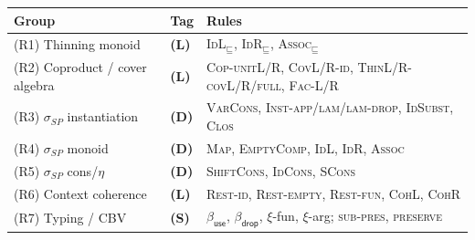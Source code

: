 \documentclass{article}
\newcommand{\thin}{\sqsubseteq}                    %
\newcommand{\catL}{\textbf{(L)}}
\newcommand{\catD}{\textbf{(D)}}
\newcommand{\catS}{\textbf{(S)}}
\theoremstyle{plain}
\begin{document}
\noindent
\begin{tabular}{@{}lll@{}}
\hline
\textbf{Group} & \textbf{Tag} & \textbf{Rules} \\
\hline
(R1) Thinning monoid & \catL & \textsc{IdL}$_\thin$, \textsc{IdR}$_\thin$, \textsc{Assoc}$_\thin$ \\
(R2) Coproduct / cover algebra & \catL & \textsc{Cop-unitL/R}, \textsc{CovL/R-id}, \textsc{ThinL/R-covL/R/full}, \textsc{Fac-L/R} \\
(R3) $\sigma_{SP}$ instantiation & \catD & \textsc{VarCons}, \textsc{Inst-app/lam/lam-drop}, \textsc{IdSubst}, \textsc{Clos} \\
(R4) $\sigma_{SP}$ monoid & \catD & \textsc{Map}, \textsc{EmptyComp}, \textsc{IdL}, \textsc{IdR}, \textsc{Assoc} \\
(R5) $\sigma_{SP}$ cons/$\eta$ & \catD & \textsc{ShiftCons}, \textsc{IdCons}, \textsc{SCons} \\
(R6) Context coherence & \catL & \textsc{Rest-id}, \textsc{Rest-empty}, \textsc{Rest-fun}, \textsc{CohL}, \textsc{CohR} \\
(R7) Typing / CBV & \catS & $\beta_{\mathsf{use}}$, $\beta_{\mathsf{drop}}$, $\xi$-fun, $\xi$-arg; \textsc{sub-pres}, \textsc{preserve} \\
\hline
\end{tabular}
\end{document}

